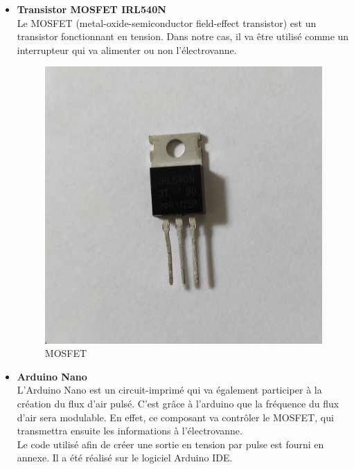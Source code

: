 \begin{itemize}
    \item \textbf{Transistor MOSFET IRL540N}\\
          Le MOSFET (metal-oxide-semiconductor field-effect transistor) est un transistor fonctionnant en tension. Dans notre cas, il va
          être utilisé comme un interrupteur qui va alimenter ou non l'électrovanne.
          \begin{figure}[H]
              \centering
              \includegraphics[scale = 0.05]{assets/figures/mosfet_visuel.jpg}
              \caption{MOSFET}
              \label{fig:mosfet}
          \end{figure}

    \item \textbf{Arduino Nano}\\
          L'Arduino Nano est un circuit-imprimé qui va également participer à la création du flux d'air pulsé. C'est grâce à l'arduino que la
          fréquence du flux d'air sera modulable. En effet, ce composant va contrôler le MOSFET, qui transmettra ensuite les informations à
          l'électrovanne.\\
          Le code utilisé afin de créer une sortie en tension par pulse est fourni en annexe. Il a été réalisé sur le logiciel Arduino IDE.
\end{itemize}

